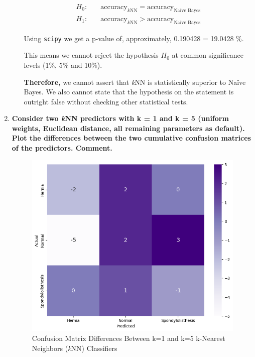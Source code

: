 \documentclass[12pt]{article}
\begin{document}
\begin{enumerate}[leftmargin=\labelsep]
\begin{enumerate}
          $$
              \begin{aligned}
                  H_0: & \quad\text{accuracy}_{k\text{NN}} = \text{accuracy}_{\text{Naïve Bayes}} \\
                  H_1: & \quad\text{accuracy}_{k\text{NN}} > \text{accuracy}_{\text{Naïve Bayes}}
              \end{aligned}
          $$

          

          Using \texttt{scipy} we get a p-value of, approximately, 0.190428 = 19.0428 \%.

          This means we cannot reject the hypothesis $H_0$ at common significance levels (1\%, 5\% and 10\%).

          \textbf{Therefore,} we cannot assert that \textit{k}NN is statistically superior to Naïve Bayes. We also cannot
          state that the hypothesis on the statement is outright false without checking other statistical tests.
          \end{enumerate}

    \item \textbf{Consider two \textit{k}NN predictors with k = 1 and k = 5 (uniform weights, Euclidean distance,
          all remaining parameters as default). Plot the differences between the two cumulative confusion
          matrices of the predictors. Comment.}

          \vskip 0.3cm
          

          \begin{figure}[H]
              \centering
              \includegraphics[width=13cm]{./assets/cummulative_heatmap_ex2_PartII.png}
              \caption{Confusion Matrix Differences Between k=1 and k=5 k-Nearest Neighbors (\textit{k}NN) Classifiers}
              \label{fig:PartII-ex2}
          \end{figure}


\end{enumerate}
\end{document}
